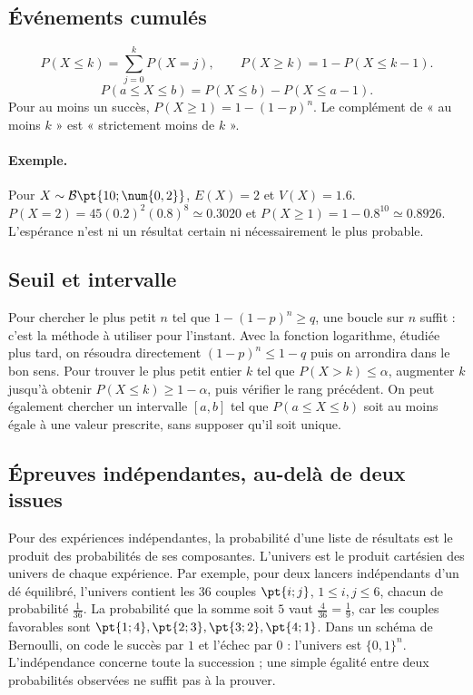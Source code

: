 \subsection{Événements cumulés}
\[P(X\le k)=\sum_{j=0}^kP(X=j),\qquad P(X\ge k)=1-P(X\le k-1).\]\[P(a\le X\le b)=P(X\le b)-P(X\le a-1).\]
Pour au moins un succès, $P(X\ge1)=1-(1-p)^n$. Le complément de « au moins $k$ » est « strictement moins de $k$ ».
\paragraph{Exemple.} Pour $X\sim\mathcal B\pt{10;\num{0,2}}$, $E(X)=2$ et $V(X)=\num{1,6}$. $P(X=2)=45(\num{0,2})^2(\num{0,8})^8\simeq\num{0,3020}$ et $P(X\ge1)=1-\num{0,8}^{10}\simeq\num{0,8926}$. L'espérance n'est ni un résultat certain ni nécessairement le plus probable.
\subsection{Seuil et intervalle}
Pour chercher le plus petit $n$ tel que $1-(1-p)^n\ge q$, une boucle sur $n$ suffit : c'est la méthode à utiliser pour l'instant. Avec la fonction logarithme, étudiée plus tard, on résoudra directement $(1-p)^n\le1-q$ puis on arrondira dans le bon sens.
Pour trouver le plus petit entier $k$ tel que $P(X>k)\le\alpha$, augmenter $k$ jusqu'à obtenir $P(X\le k)\ge1-\alpha$, puis vérifier le rang précédent. On peut également chercher un intervalle $[a,b]$ tel que $P(a\le X\le b)$ soit au moins égale à une valeur prescrite, sans supposer qu'il soit unique.
\subsection{Épreuves indépendantes, au-delà de deux issues}
Pour des expériences indépendantes, la probabilité d'une liste de résultats est le produit des probabilités de ses composantes. L'univers est le produit cartésien des univers de chaque expérience. Par exemple, pour deux lancers indépendants d'un dé équilibré, l'univers contient les $36$ couples $\pt{i;j}$, $1\le i,j\le6$, chacun de probabilité $\frac{1}{36}$. La probabilité que la somme soit $5$ vaut $\frac{4}{36}=\frac{1}{9}$, car les couples favorables sont $\pt{1;4},\pt{2;3},\pt{3;2},\pt{4;1}$.
Dans un schéma de Bernoulli, on code le succès par $1$ et l'échec par $0$ : l'univers est $\{0,1\}^n$. L'indépendance concerne toute la succession ; une simple égalité entre deux probabilités observées ne suffit pas à la prouver.


\mxnewpage
